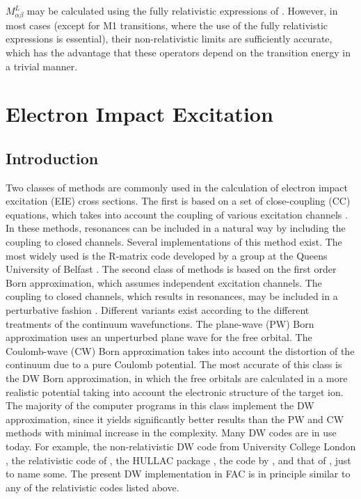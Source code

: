 $M^L_{\alpha\beta}$ may be calculated using the fully relativistic
expressions of \citet{grant:1974a}. However, in most cases (except for M1
transitions, where the use of the fully relativistic expressions is
essential), their non-relativistic 
limits are sufficiently accurate, which has the advantage that these operators
depend on the transition energy in a trivial manner. 


\section{Electron Impact Excitation}
\label{sec:eie}
\subsection{Introduction}
Two classes of methods are commonly used in the calculation of electron impact
excitation (EIE) cross sections. The first is based on a set of close-coupling
(CC) equations, which takes into account the coupling of various excitation
channels \cite{seaton:1976a}. In these methods, resonances can be included in a
natural way by including the coupling to closed channels. Several
implementations of this method exist. The most widely used is the R-matrix code
developed by a group at the Queens University of Belfast
\cite{berrington:1995a}. The second class of methods is based on the first order
Born approximation, which assumes independent excitation channels. The coupling
to closed channels, which results in resonances, may be included in a
perturbative fashion \cite{eissner:1972a}. Different variants exist according to
the different treatments of the continuum wavefunctions. The plane-wave (PW)
Born approximation uses an unperturbed plane wave for the free orbital. The
Coulomb-wave (CW) Born approximation takes into account the distortion of the
continuum due to a pure Coulomb potential. The most accurate of this class is
the DW Born approximation, in which the free orbitals are calculated in a more
realistic potential taking into account the electronic structure of the target
ion. The majority of the computer programs in this class implement the DW
approximation, since it yields significantly better results than the PW and CW
methods with minimal increase in the complexity. Many DW codes are in use today.
For example, the non-relativistic DW code from University College London
\cite{eissner:1998a}, the relativistic code of \citet{hagelstein:1987a}, the
HULLAC package \cite{barshalom:1988a}, the code by \citet{zhang:1989a}, and that
of \citet{chen:1996a}, just to name some. The present DW implementation in FAC
is in principle similar to any of the relativistic codes listed above.

